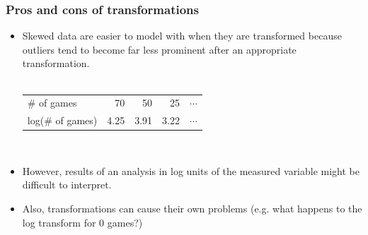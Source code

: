 \documentclass[slidestop,compress,mathserif]{beamer}
\makeatletter
\newcommand{\soln}[1]{\textit{#1}}
\def\chpii@path{../../Chp 2}
\makeatother
\begin{document}
\begin{frame}
\frametitle{Pros and cons of transformations}

\begin{itemize}

\item Skewed data are easier to model with when they are transformed because outliers tend to become far less prominent after an appropriate transformation. \\
$\:$ \\
\renewcommand{\arraystretch}{1.5}
\begin{tabular}{l r r r r }
\# of games		&  70 	& 50 		& 25 		 		& $\cdots$ \\
log(\# of games)	& 4.25	& 3.91 	& 3.22 	 	& $\cdots$
\end{tabular}

$\:$ \\

\item However, results of an analysis in log units of the measured variable might be difficult to interpret.
\item Also, transformations can cause their own problems (e.g. what happens to the log transform for 0 games?)

\end{itemize}

\pause


\soln{}

\end{frame}






\end{document}
